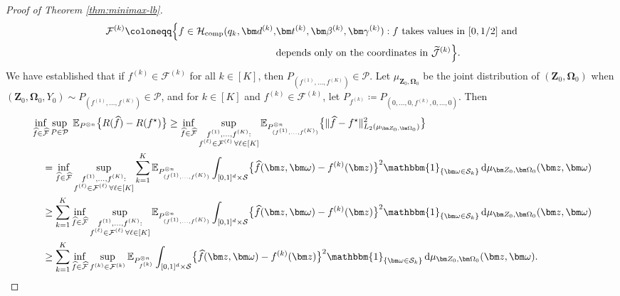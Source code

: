 \documentclass[12pt]{article}
\def\hat{\widehat}
\def\tilde{\widetilde}
\begin{document}
\begin{proof}[Proof of Theorem \ref{thm:minimax-lb}]
    \begin{align*}
    \mathcal{F}^{(k)} \coloneqq \Bigl\{ f \in \mathcal{H}_{\mathrm{comp}}(q_k,\bm d^{(k)}, &\bm t^{(k)}, \bm \beta^{(k)}, \bm\gamma^{(k)}): f \text{ takes values in } [0,1/2] \text{ and}\\
    &\text{depends only on the coordinates in $\tilde{\mathcal{J}}^{(k)}$} \Bigr\}.
    \end{align*}
    We have established that if $f^{(k)} \in \mathcal{F}^{(k)}$ for all $k\in[K]$, then $P_{(f^{(1)}, \ldots, f^{(K)})} \in \mathcal{P}$.
    Let $\mu_{\bm{Z}_0,\bm{\Omega}_0}$ be the joint distribution of $(\bm{Z}_0,\bm{\Omega}_0)$ when $(\bm{Z}_0,\bm{\Omega}_0,Y_0) \sim P_{(f^{(1)}, \ldots, f^{(K)})} \in \mathcal{P}$, and for $k\in[K]$ and $f^{(k)} \in \mathcal{F}^{(k)}$, let $P_{f^{(k)}} \coloneqq P_{(0,\ldots,0,f^{(k)},0,\ldots,0)}$.  Then
    \begin{align}
        &\inf_{\hat{f}\in \hat{\mathcal{F}}} \sup_{P \in \mathcal{P}} \;\mathbb{E}_{P^{\otimes n}}\bigl\{R(\hat{f}) - R(f^{\star})\bigr\} 
        \geq \inf_{\hat{f}\in \hat{\mathcal{F}}} \sup_{\substack{f^{(1)},\ldots,f^{(K)} : \\ f^{(\ell)} \in \mathcal{F}^{(\ell)} \,\forall \ell\in[K]}} \mathbb{E}_{P_{(f^{(1)}, \ldots, f^{(K)})}^{\otimes n}}\bigl\{\|\hat{f} - f^{\star}\|_{L_2(\mu_{\bm Z_0,\bm\Omega_0})}^2\bigr\} \nonumber\\
        &\hspace{0.4cm}= \inf_{\hat{f} \in \hat{\mathcal{F}}} \sup_{\substack{f^{(1)},\ldots,f^{(K)} : \\ f^{(\ell)} \in \mathcal{F}^{(\ell)} \,\forall \ell\in[K]}} \sum_{k=1}^K \mathbb{E}_{P_{(f^{(1)}, \ldots, f^{(K)})}^{\otimes n}} \int_{[0,1]^d \times \mathcal{S}} \bigl\{\hat{f}(\bm z,\bm\omega) - f^{(k)}(\bm z)\bigr\}^2 \mathbbm{1}_{\{\bm\omega\in\mathcal{S}_k\}} \, \mathrm{d}\mu_{\bm Z_0,\bm\Omega_0}(\bm z, \bm \omega) \nonumber\\
        &\hspace{0.4cm}\geq \sum_{k=1}^K \inf_{\hat{f} \in \hat{\mathcal{F}}} \sup_{\substack{f^{(1)},\ldots,f^{(K)} : \\ f^{(\ell)} \in \mathcal{F}^{(\ell)} \,\forall \ell\in[K]}}  \mathbb{E}_{P_{(f^{(1)}, \ldots, f^{(K)})}^{\otimes n}} \int_{[0,1]^d \times \mathcal{S}} \bigl\{\hat{f}(\bm z,\bm\omega) - f^{(k)}(\bm z)\bigr\}^2 \mathbbm{1}_{\{\bm\omega\in\mathcal{S}_k\}} \, \mathrm{d}\mu_{\bm Z_0,\bm\Omega_0}(\bm z, \bm \omega)\nonumber\\
        &\hspace{0.4cm}\geq \sum_{k=1}^K \inf_{\hat{f} \in \hat{\mathcal{F}}} \sup_{f^{(k)} \in \mathcal{F}^{(k)}}  \mathbb{E}_{P_{f^{(k)}}^{\otimes n}} \int_{[0,1]^d \times \mathcal{S}} \bigl\{\hat{f}(\bm z,\bm\omega) - f^{(k)}(\bm z)\bigr\}^2 \mathbbm{1}_{\{\bm\omega\in\mathcal{S}_k\}} \, \mathrm{d}\mu_{\bm Z_0,\bm\Omega_0}(\bm z, \bm \omega). \label{eq:minimax-lower-bound-k-simplified}
    \end{align}


\end{proof}
\end{document}
